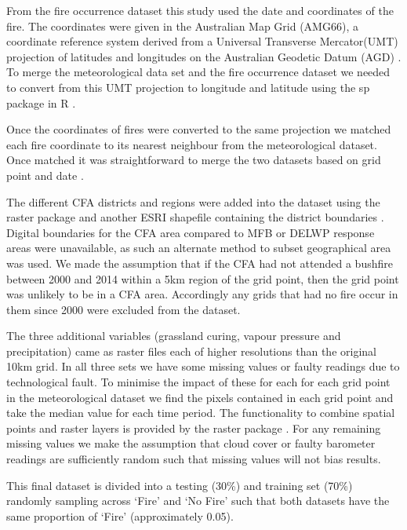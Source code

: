 \documentclass[11pt,a4paper]{article}
\begin{document}
From the fire occurrence dataset this study used the date and coordinates of the fire. The coordinates were given in the Australian Map Grid (AMG66), a coordinate reference system derived from a Universal Transverse Mercator(UMT) projection of latitudes and longitudes on the Australian Geodetic Datum (AGD) \citep{featherstone96}. To merge the meteorological data set and the fire occurrence dataset we needed to convert from this UMT projection to longitude and latitude using the sp package in R \citep{sp08}.

Once the coordinates of fires were converted to the same projection we matched each fire coordinate to its nearest neighbour from the meteorological dataset. Once matched it was straightforward to merge the two datasets based on grid point and date \citep{datatable}.

The different CFA districts and regions were added into the dataset using the raster package and another ESRI shapefile containing the district boundaries \citep{raster}.
Digital boundaries for the CFA area compared to MFB or DELWP response areas were unavailable, as such an alternate method to subset geographical area was used. We made the assumption that if the CFA had not attended a bushfire between 2000 and 2014 within a 5km region of the grid point, then the grid point was unlikely to be in a CFA area. Accordingly any grids that had no fire occur in them since 2000 were excluded from the dataset.

The three additional variables (grassland curing, vapour pressure and precipitation) came as raster files each of higher resolutions than the original 10km grid. In all three sets we have some missing values or faulty readings due to technological fault. To minimise the impact of these for each for each grid point in the meteorological dataset we find the pixels contained in each grid point and take the median value for each time period. The functionality to combine spatial points and raster layers is provided by the raster package \citep{raster}. For any remaining missing values we make the assumption that cloud cover or faulty barometer readings are sufficiently random such that missing values will not bias results.


This final dataset is divided into a testing (30\%) and training set (70\%) randomly sampling across `Fire' and `No Fire' such that both datasets have the same proportion of `Fire' (approximately 0.05).
\end{document}

